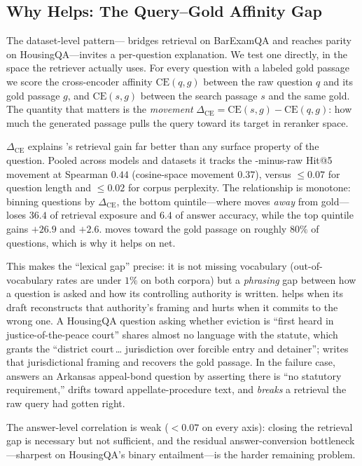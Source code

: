
\subsection{Why \hyre{} Helps: The Query--Gold Affinity Gap}\label{subsec:mechanism}

The dataset-level pattern---\hyre{} bridges retrieval on BarExamQA and reaches
parity on HousingQA---invites a per-question explanation. We test one directly,
in the space the retriever actually uses. For every question with a labeled gold
passage we score the cross-encoder affinity $\mathrm{CE}(q,g)$ between the raw
question $q$ and its gold passage $g$, and $\mathrm{CE}(s,g)$ between the
\hyre{} search passage $s$ and the same gold. The quantity that matters is the
\emph{movement} $\Delta_{\mathrm{CE}} = \mathrm{CE}(s,g)-\mathrm{CE}(q,g)$: how
much the generated passage pulls the query toward its target in reranker space.

$\Delta_{\mathrm{CE}}$ explains \hyre{}'s retrieval gain far better than any
surface property of the question. Pooled across models and datasets it tracks
the \hyre{}-minus-raw Hit@5 movement at Spearman $0.44$ (cosine-space movement
$0.37$), versus $\le 0.07$ for question length and $\le 0.02$ for corpus
perplexity. The relationship is monotone: binning questions by
$\Delta_{\mathrm{CE}}$, the bottom quintile---where \hyre{} moves \emph{away}
from gold---loses $36.4$\pp{} of retrieval exposure and $6.4$\pp{} of answer
accuracy, while the top quintile gains $+26.9$\pp{} and $+2.6$\pp{}. \hyre{}
moves toward the gold passage on roughly $80\%$ of questions, which is why it
helps on net.

This makes the ``lexical gap'' precise: it is not missing vocabulary
(out-of-vocabulary rates are under $1\%$ on both corpora) but a \emph{phrasing}
gap between how a question is asked and how its controlling authority is
written. \hyre{} helps when its draft reconstructs that authority's framing and
hurts when it commits to the wrong one. A HousingQA question asking whether
eviction is ``first heard in justice-of-the-peace court'' shares almost no
language with the statute, which grants the ``district court\,\dots
jurisdiction over forcible entry and detainer''; \hyre{} writes that
jurisdictional framing and recovers the gold passage. In the failure case,
\hyre{} answers an Arkansas appeal-bond question by asserting there is ``no
statutory requirement,'' drifts toward appellate-procedure text, and
\emph{breaks} a retrieval the raw query had gotten right.

The answer-level correlation is weak ($<0.07$ on every axis): closing the
retrieval gap is necessary but not sufficient, and the residual
answer-conversion bottleneck---sharpest on HousingQA's binary entailment---is
the harder remaining problem.
